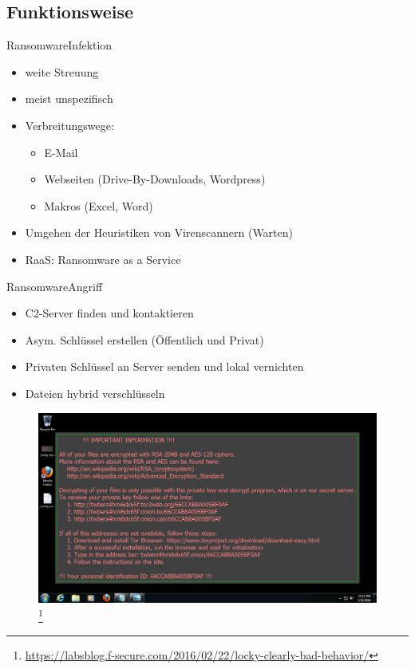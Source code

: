 \documentclass[10pt]{beamer}
\begin{document}
\subsection{Funktionsweise}
\begin{frame}{Ransomware}{Infektion}
		\begin{itemize}
			\item weite Streuung
			\item meist unspezifisch
			\item Verbreitungswege:
				\begin{itemize}
					\item E-Mail
					\item Webseiten (Drive-By-Downloads, Wordpress)
					\item Makros (Excel, Word)
				\end{itemize}
			\item Umgehen der Heuristiken von Virenscannern (Warten)
			\item RaaS: Ransomware as a Service
		\end{itemize}
\end{frame}
\begin{frame}{Ransomware}{Angriff}
		\begin{itemize}
			\item C2-Server finden und kontaktieren
			\item Asym. Schlüssel erstellen (Öffentlich und Privat)
			\item Privaten Schlüssel an Server senden und lokal vernichten
			\item Dateien hybrid verschlüsseln 
		\end{itemize}
\end{frame}

\begin{frame}[plain]
	\begin{figure}[p]
		\centering
		\includegraphics[scale=0.30]{locky-recover-instructions.png}
		\let\thefootnote\relax\footnote{\url{https://labsblog.f-secure.com/2016/02/22/locky-clearly-bad-behavior/}}
	\end{figure}
\end{frame}
\end{document}
